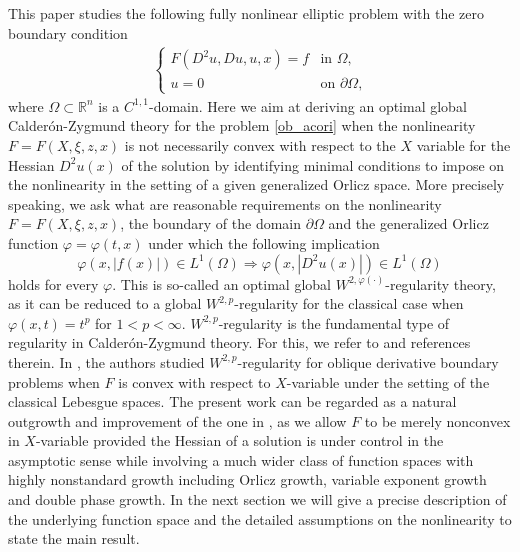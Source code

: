 \documentclass[11pt, reqno]{amsart}
\numberwithin{equation}{section}
\begin{document}
This paper studies the following fully nonlinear elliptic problem
with the zero boundary condition
\begin{align}\label{ob_acori}
\left\{ \begin{array}{ll}
F(D^{2}u,Du,u,x) = f & \textrm{in $\Omega, $}\\
u=0 & \textrm{on $\partial \Omega$,}
\end{array} \right.
\end{align}
where $\Omega \subset \mathbb{R}^{n}$ is a $C^{1,1}$-domain. Here we
aim at deriving an optimal global Calder\'{o}n-Zygmund theory for
the problem \eqref{ob_acori} when the nonlinearity $F=F(X,\xi,z,x)$
is not necessarily convex with respect to the $X$ variable for the
Hessian $D^2u(x)$ of the solution by identifying minimal conditions
to impose on the nonlinearity in the setting of a given generalized
Orlicz space. More precisely speaking, we ask what are reasonable
requirements on the nonlinearity $F=F(X,\xi,z,x)$, the boundary of
the domain $\partial \Omega$ and the generalized Orlicz function
$\varphi=\varphi(t,x)$ under which the following implication
$$ \varphi(x, |f(x)|) \in L^1(\Omega) \Longrightarrow \varphi(x,
|D^2u(x)|) \in L^1(\Omega)$$ holds for every $\varphi$. This is
so-called an optimal global $W^{2, \varphi(\cdot)}$-regularity
theory, as it can be reduced to a global $W^{2,p}$-regularity for
the classical case when $\varphi(x,t)=t^p$ for $1<p<\infty$.
$W^{2,p}$-regularity is the fundamental type of regularity in
Calder\'{o}n-Zygmund theory. For this, we refer to \cite{MR1088476,
MR1191890, MR3335124, MR3479199} and references therein. 
In \cite{MR4046185}, the authors studied $W^{2,p}$-regularity for oblique derivative boundary problems when
$F$ is convex with respect to $X$-variable under the setting of the
classical Lebesgue spaces. The present work can be regarded as a
natural outgrowth and improvement of the one in \cite{MR3957152, MR4258789}, as
we allow $F$ to be merely nonconvex in $X$-variable provided the
Hessian of a solution is under control in the asymptotic sense while
involving a much wider class of function spaces with highly
nonstandard growth including Orlicz growth, variable exponent growth
and double phase growth. In the next section we will give a precise
description of the underlying function space and the detailed
assumptions on the nonlinearity to state the main result.
\end{document}
